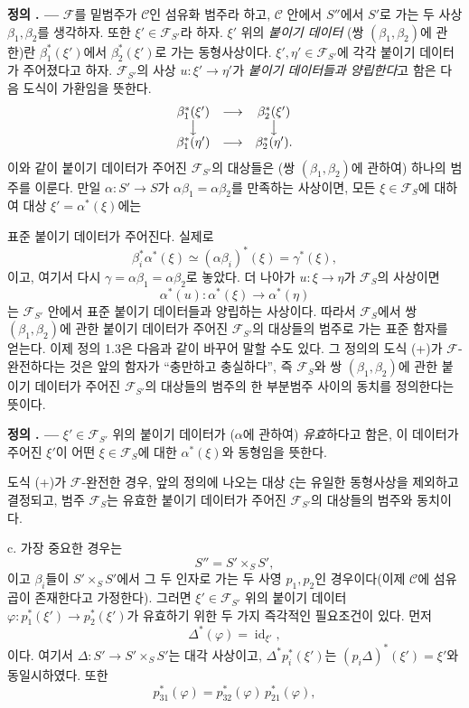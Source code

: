 \documentclass[11pt,twoside,openany]{book}
\numberwithin{equation}{section}
\newcommand{\sourceunit}{front}
\newcommand{\src}[1]{%
  \phantomsection\hypertarget{src:\sourceunit:#1}{}%
  \marginpar{\raggedleft\footnotesize\sffamily #1}%
}
\theoremstyle{plain}
\theoremstyle{definition}
\theoremstyle{remark}
\newcommand{\result}[2]{%
  \par\medskip\noindent\textbf{#1%
  \if\relax\detokenize{#2}\relax\else\space#2\fi. ---}\enspace
}
\begin{document}
\result{정의}{1.4} $\mathcal F$를 밑범주가 $\mathcal C$인 섬유화 범주라
하고, $\mathcal C$ 안에서 $S''$에서 $S'$로 가는 두 사상
$\beta_1,\beta_2$를 생각하자. 또한
$\xi'\in\mathcal F_{S'}$라 하자. $\xi'$ 위의 \emph{붙이기 데이터}
(쌍 $(\beta_1,\beta_2)$에 관한)란 $\beta_1^*(\xi')$에서
$\beta_2^*(\xi')$로 가는 동형사상이다. $\xi',\eta'\in\mathcal F_{S'}$에
각각 붙이기 데이터가 주어졌다고 하자. $\mathcal F_{S'}$의 사상
$u:\xi'\longrightarrow\eta'$가 \emph{붙이기 데이터들과 양립한다}고 함은
다음 도식이 가환임을 뜻한다.
\[
\begin{array}{ccc}
  \beta_1^*(\xi') & \longrightarrow & \beta_2^*(\xi') \\
  \big\downarrow && \big\downarrow \\
  \beta_1^*(\eta') & \longrightarrow & \beta_2^*(\eta').
\end{array}
\]
이와 같이 붙이기 데이터가 주어진 $\mathcal F_{S'}$의 대상들은
(쌍 $(\beta_1,\beta_2)$에 관하여) 하나의 범주를 이룬다. 만일
$\alpha:S'\longrightarrow S$가 $\alpha\beta_1=\alpha\beta_2$를 만족하는
사상이면, 모든 $\xi\in\mathcal F_S$에 대하여 대상 $\xi'=\alpha^*(\xi)$에는

\src{302}
표준 붙이기 데이터가 주어진다. 실제로
\[
  \beta_i^*\alpha^*(\xi)\simeq(\alpha\beta_i)^*(\xi)=\gamma^*(\xi),
\]
이고, 여기서 다시 $\gamma=\alpha\beta_1=\alpha\beta_2$로 놓았다. 더 나아가
$u:\xi\longrightarrow\eta$가 $\mathcal F_S$의 사상이면
\[
  \alpha^*(u):\alpha^*(\xi)\longrightarrow\alpha^*(\eta)
\]
는 $\mathcal F_{S'}$ 안에서 표준 붙이기 데이터들과 양립하는
사상이다. 따라서 $\mathcal F_S$에서 쌍 $(\beta_1,\beta_2)$에 관한
붙이기 데이터가 주어진 $\mathcal F_{S'}$의 대상들의 범주로 가는
표준 함자를 얻는다. 이제 정의 1.3은 다음과 같이 바꾸어 말할 수도 있다.
그 정의의 도식 (+)가 $\mathcal F$-완전하다는 것은 앞의 함자가 ``충만하고
충실하다'', 즉 $\mathcal F_S$와 쌍 $(\beta_1,\beta_2)$에 관한 붙이기
데이터가 주어진 $\mathcal F_{S'}$의 대상들의 범주의 한 부분범주 사이의
동치를 정의한다는 뜻이다.

\result{정의}{1.5} $\xi'\in\mathcal F_{S'}$ 위의 붙이기 데이터가
($\alpha$에 관하여) \emph{유효}하다고 함은, 이 데이터가 주어진 $\xi'$이
어떤 $\xi\in\mathcal F_S$에 대한 $\alpha^*(\xi)$와 동형임을
뜻한다.

도식 (+)가 $\mathcal F$-완전한 경우, 앞의 정의에 나오는 대상 $\xi$는
유일한 동형사상을 제외하고 결정되고, 범주 $\mathcal F_S$는
유효한 붙이기 데이터가 주어진 $\mathcal F_{S'}$의 대상들의 범주와
동치이다.

\medskip\noindent
c. 가장 중요한 경우는
\[
  S''=S'\times_S S',
\]
이고 $\beta_i$들이 $S'\times_S S'$에서 그 두 인자로 가는 두 사영
$p_1,p_2$인 경우이다(이제 $\mathcal C$에 섬유곱이 존재한다고 가정한다).
그러면 $\xi'\in\mathcal F_{S'}$ 위의 붙이기 데이터
$\varphi:p_1^*(\xi')\longrightarrow p_2^*(\xi')$가 유효하기 위한
두 가지 즉각적인 필요조건이 있다. 먼저
\[
  \tag{i}
  \Delta^*(\varphi)=\operatorname{id}_{\xi'},
\]
이다. 여기서 $\Delta:S'\longrightarrow S'\times_S S'$는 대각 사상이고,
$\Delta^*p_i^*(\xi')$는 $(p_i\Delta)^*(\xi')=\xi'$와
동일시하였다. 또한
\[
  \tag{ii}
  p_{31}^*(\varphi)=p_{32}^*(\varphi)\,p_{21}^*(\varphi),
\]
\end{document}
